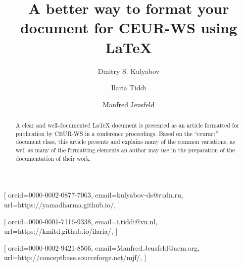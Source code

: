 \documentclass[
]{ceurart}
\begin{document}


\title{A better way to format your document for CEUR-WS using LaTeX}

\tnotemark[1]

\author[1,2]{Dmitry S. Kulyabov}[%
orcid=0000-0002-0877-7063,
email=kulyabov-ds@rudn.ru,
url=https://yamadharma.github.io/,
]
\cormark[1]
\fnmark[1]
\address[1]{Peoples' Friendship University of Russia (RUDN University),
  6 Miklukho-Maklaya St, Moscow, 117198, Russian Federation}
\address[2]{Joint Institute for Nuclear Research,
  6 Joliot-Curie, Dubna, Moscow region, 141980, Russian Federation}

\author[3]{Ilaria Tiddi}[%
orcid=0000-0001-7116-9338,
email=i.tiddi@vu.nl,
url=https://kmitd.github.io/ilaria/,
]
\fnmark[1]
\address[3]{Vrije Universiteit Amsterdam, De Boelelaan 1105, 1081 HV Amsterdam, The Netherlands}

\author[4]{Manfred Jeusfeld}[%
orcid=0000-0002-9421-8566,
email=Manfred.Jeusfeld@acm.org,
url=http://conceptbase.sourceforge.net/mjf/,
]
\fnmark[1]
\address[4]{University of Skövde, Högskolevägen 1, 541 28 Skövde, Sweden}


\begin{abstract}
  A clear and well-documented \LaTeX{} document is presented as an
  article formatted for publication by CEUR-WS in a conference
  proceedings. Based on the ``ceurart'' document class, this article
  presents and explains many of the common variations, as well as many
  of the formatting elements an author may use in the preparation of
  the documentation of their work.
\end{abstract}
\end{document}
